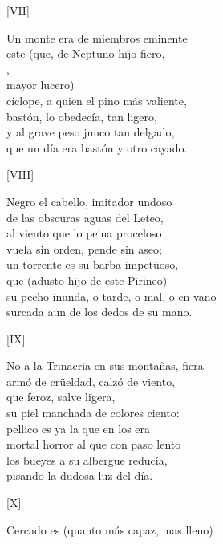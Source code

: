 \documentclass[11pt,a4paper,twoside]{article}
\begin{document}
%
\begin{center}
	[VII]
\end{center}\pstart
Un monte era de miembros eminente\\
este (que, de Neptuno hijo fiero,\\
,\\
 mayor lucero)\\
cíclope, a quien el pino más valiente,\\
bastón, lo obedecía, tan ligero,\\
y al grave peso junco tan delgado,\\
que un día era bastón y otro cayado.\par\pend
%
\begin{center}
	[VIII]
\end{center}\pstart
Negro el cabello, imitador undoso\\
de las obscuras aguas del Leteo,\\
al viento que lo peina proceloso\\
vuela sin orden, pende sin aseo;\\
un torrente es su barba impetüoso,\\
que (adusto hijo de este Pirineo)\\
su pecho inunda, o tarde, o mal, o en vano\\
surcada aun de los dedos de su mano.\par\pend
%
\begin{center}
	[IX]
\end{center}\pstart
No a la Trinacria en sus montañas, fiera\\
armó de crüeldad, calzó de viento,\\
que  feroz, salve ligera,\\
su piel manchada de colores ciento:\\
pellico es ya la que en los  era\\
mortal horror al que con paso lento\\
los bueyes a su albergue reducía,\\
pisando la dudosa luz del día.\par\pend
%
\begin{center}
	[X]
\end{center}\pstart
Cercado es (quanto más capaz, mas lleno)\\
\end{document}
